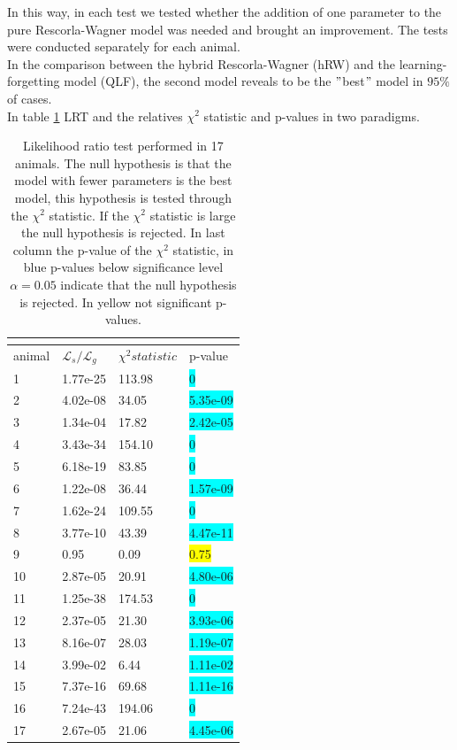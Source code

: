In this way, in each test we tested whether the addition of one parameter to the pure Rescorla-Wagner model was needed and brought an improvement. The tests were conducted separately for each animal.\\In the comparison between the hybrid Rescorla-Wagner (hRW) and the learning-forgetting model (QLF), the second model reveals to be the $"$best$"$ model in $95\%$ of cases.\\
In table \ref{tab:ModelComparison} LRT and the relatives $\chi^2$ statistic and p-values in two paradigms.
\begin{table}[H]
\begin{tabular}{|p{3cm}|p{3cm}|p{3cm}|p{3cm}|}
\hline
\multicolumn{4}{|c|}{\cellcolor{blue!25}{Comparison between hRW model and QLF model (Likelihood ratio test)}}\\
\hline
 \cellcolor[gray]{0.9} animal & \cellcolor[gray]{0.9} $\mathcal{L}_s / \mathcal{L}_g$& \cellcolor[gray]{0.9} $\chi^2 statistic$ & \cellcolor[gray]{0.9} p-value\\
 \hline
 1& 1.77e-25 & 113.98 & \colorbox{cyan}{0}\\
 \hline
 2& 4.02e-08 & 34.05 & \colorbox{cyan}{5.35e-09}\\
 \hline
 3 & 1.34e-04 & 17.82 & \colorbox{cyan}{2.42e-05}\\
 \hline
 4 & 3.43e-34 & 154.10 & \colorbox{cyan}{0}\\
 \hline
 5 & 6.18e-19 & 83.85 & \colorbox{cyan}{0}\\
 \hline
 6 & 1.22e-08 & 36.44 & \colorbox{cyan}{1.57e-09}\\
 \hline
 7 & 1.62e-24 & 109.55 & \colorbox{cyan}{0}\\
 \hline
 8 & 3.77e-10 & 43.39 & \colorbox{cyan}{4.47e-11}\\
 \hline
 9 & 0.95 & 0.09 & \colorbox{yellow}{0.75}\\
 \hline
 10 & 2.87e-05 & 20.91 & \colorbox{cyan}{4.80e-06}\\
 \hline
 11 & 1.25e-38 & 174.53 & \colorbox{cyan}{0}\\
 \hline
 12 & 2.37e-05 & 21.30 & \colorbox{cyan}{3.93e-06}\\
 \hline
 13 & 8.16e-07 & 28.03 & \colorbox{cyan}{1.19e-07}\\
 \hline
 14 & 3.99e-02 & 6.44 & \colorbox{cyan}{1.11e-02}\\
 \hline
 15 & 7.37e-16 & 69.68 & \colorbox{cyan}{1.11e-16}\\
 \hline
 16 & 7.24e-43 & 194.06 & \colorbox{cyan}{0}\\
 \hline
 17 & 2.67e-05 & 21.06 & \colorbox{cyan}{4.45e-06}\\
 \hline
\end{tabular}
\caption{Likelihood ratio test performed in 17 animals. The null hypothesis is that the model with fewer parameters is the best model, this hypothesis is tested through the $\chi^2$ statistic. If the $\chi^2$ statistic is large the null hypothesis is rejected. In last column the p-value of the $\chi^2$ statistic, in blue p-values below significance level $\alpha=0.05$ indicate that the null hypothesis is rejected. In yellow not significant p-values.}
\label{tab:ModelComparison}
\end{table}
